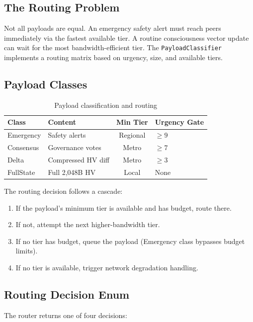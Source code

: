 \documentclass[11pt,twocolumn]{article}
\begin{document}
\subsection{The Routing Problem}

Not all payloads are equal. An emergency safety alert must reach peers
immediately via the fastest available tier. A routine consciousness vector
update can wait for the most bandwidth-efficient tier. The
\texttt{PayloadClassifier} implements a routing matrix based on urgency,
size, and available tiers.

\subsection{Payload Classes}

\begin{table}[H]
\centering
\caption{Payload classification and routing}
\label{tab:payload}
\scriptsize
\begin{tabular}{@{}llcl@{}}
\toprule
\textbf{Class} & \textbf{Content} & \textbf{Min Tier} & \textbf{Urgency Gate} \\
\midrule
Emergency & Safety alerts & Regional & $\geq 9$ \\
Consensus & Governance votes & Metro & $\geq 7$ \\
Delta & Compressed HV diff & Metro & $\geq 3$ \\
FullState & Full 2,048B HV & Local & None \\
\bottomrule
\end{tabular}
\end{table}

The routing decision follows a cascade:
\begin{enumerate}[nosep]
  \item If the payload's minimum tier is available and has budget, route there.
  \item If not, attempt the next higher-bandwidth tier.
  \item If no tier has budget, queue the payload (Emergency class bypasses
    budget limits).
  \item If no tier is available, trigger network degradation handling.
\end{enumerate}

\subsection{Routing Decision Enum}

The router returns one of four decisions:
\end{document}
